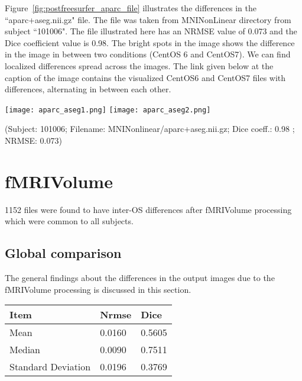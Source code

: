Figure~\ref{fig:postfreesurfer_aparc_file} illustrates the differences in the ``aparc+aseg.nii.gz" file. The file was taken from MNINonLinear directory from subject ``101006". The file illustrated here has an NRMSE value of 0.073 and the Dice coefficient value is 0.98. The bright spots in the image shows the difference in the image in between two conditions (CentOS 6 and CentOS7). We can find localized differences spread across the images. The link given below at the caption of the image contains the visualized CentOS6 and CentOS7 files with differences, alternating in between each other.

\begin{center}
\texttt{[image: aparc\_aseg1.png]}%
\texttt{[image: aparc\_aseg2.png]}%
\caption*{(Subject: 101006; Filename: MNINonlinear/aparc+aseg.nii.gz; Dice coeff.: 0.98 ; NRMSE: 0.073)}
\label{fig:postfreesurfer_aparc_file}
\end{center}

\section{fMRIVolume}\label{sec:fMRI}
1152 files were found to have inter-OS differences after fMRIVolume processing which were common to all subjects.
\subsection{Global comparison}
The general findings about the differences in the output images due to the fMRIVolume processing is discussed in this section.

\begin{center}
\begin{tabular}{|l|l|l|}
\hline
\textbf{Item}      & \textbf{Nrmse}  & \textbf{Dice} \\ \hline
Mean               & 0.0160    & 0.5605   \\ \hline
Median             & 0.0090     & 0.7511   \\ \hline
Standard Deviation & 0.0196     & 0.3769   \\ \hline
\end{tabular}
\label{tab:fMRIVolume_Metric_Values}
\end{center}

